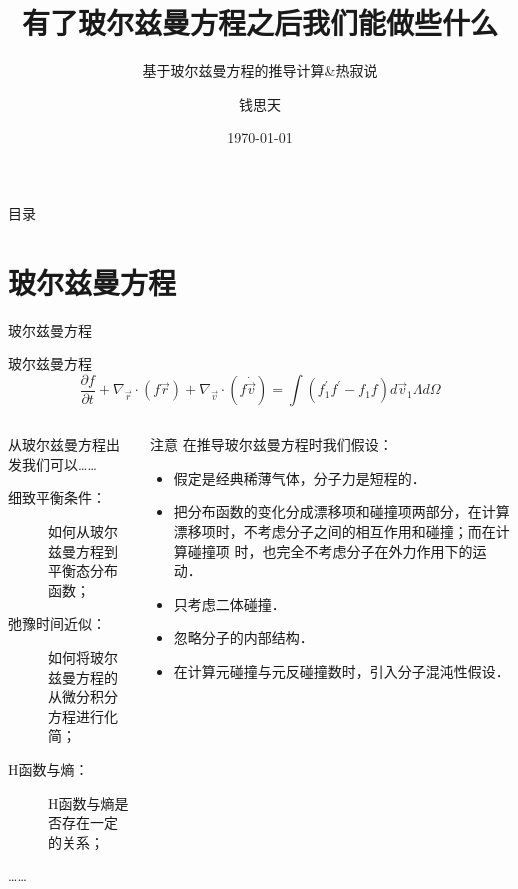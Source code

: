 \documentclass{if-beamer}
\title[平衡态统计物理讨论班]{有了玻尔兹曼方程之后我们能做些什么}
\subtitle{基于玻尔兹曼方程的推导计算\&热寂说}
\author{钱思天}
\institute[PKU]{
  Peking University
}
\date{\today}
\begin{document}
\begin{frame}
  \titlepage
\end{frame}

\begin{frame}{目录}
  \tableofcontents
\end{frame}

\section{玻尔兹曼方程}
\begin{frame}{玻尔兹曼方程}
\begin{exampleblock}{玻尔兹曼方程}
\begin{equation*}
    \frac{\partial f}{\partial t}+\nabla_{\vec{r}} \cdot(f \vec{r})+\nabla_{\vec{v}} \cdot(f \dot{\vec{v}})=\int\left(f_{1}^{\prime} f^{\prime}-f_{1} f\right) d \vec{v}_{1} \Lambda d \Omega
\end{equation*}
\end{exampleblock}
\begin{columns}

\begin{column}{0.5\textwidth}
    
    \begin{block}{从玻尔兹曼方程出发我们可以……}
        \begin{description}
            \item [细致平衡条件：] 如何从玻尔兹曼方程到平衡态分布函数；
            \item [弛豫时间近似：]如何将玻尔兹曼方程的从微分积分方程进行化简；
            \item [H函数与熵：]H函数与熵是否存在一定的关系；
            \item [……]
        \end{description}  
    \end{block}

\end{column}

\begin{column}{0.5\textwidth}
\begin{alertblock}{注意}
    在推导玻尔兹曼方程时我们假设：
\begin{itemize}
    \item 假定是经典稀薄气体，分子力是短程的．
    \item 把分布函数的变化分成漂移项和碰撞项两部分，在计算
    漂移项时，不考虑分子之间的相互作用和碰撞；而在计算碰撞项
    时，也完全不考虑分子在外力作用下的运动．
    \item 只考虑二体碰撞．
    \item 忽略分子的内部结构．
    \item 在计算元碰撞与元反碰撞数时，引入分子混沌性假设．
\end{itemize}
    

\end{alertblock}
\end{column}
\end{columns}
\end{frame}
\end{document}
